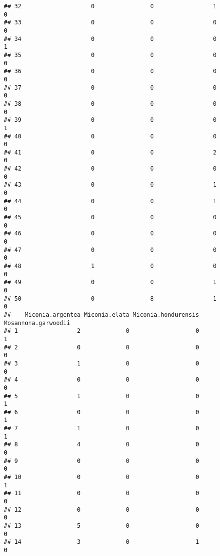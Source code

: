 \documentclass[
]{article}
\begin{document}
\begin{verbatim}
## 32                    0                0                 1               0
## 33                    0                0                 0               0
## 34                    0                0                 0               1
## 35                    0                0                 0               0
## 36                    0                0                 0               0
## 37                    0                0                 0               0
## 38                    0                0                 0               0
## 39                    0                0                 0               1
## 40                    0                0                 0               0
## 41                    0                0                 2               0
## 42                    0                0                 0               0
## 43                    0                0                 1               0
## 44                    0                0                 1               0
## 45                    0                0                 0               0
## 46                    0                0                 0               0
## 47                    0                0                 0               0
## 48                    1                0                 0               0
## 49                    0                0                 1               0
## 50                    0                8                 1               0
##    Miconia.argentea Miconia.elata Miconia.hondurensis Mosannona.garwoodii
## 1                 2             0                   0                   1
## 2                 0             0                   0                   0
## 3                 1             0                   0                   0
## 4                 0             0                   0                   0
## 5                 1             0                   0                   1
## 6                 0             0                   0                   1
## 7                 1             0                   0                   1
## 8                 4             0                   0                   0
## 9                 0             0                   0                   0
## 10                0             0                   0                   1
## 11                0             0                   0                   0
## 12                0             0                   0                   0
## 13                5             0                   0                   0
## 14                3             0                   1                   0

\end{verbatim}
\end{document}
